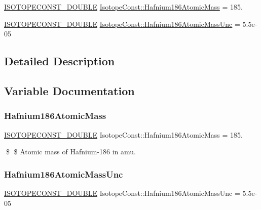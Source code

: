 \begin{DoxyCompactItemize}
\item 
\mbox{\hyperlink{group___isotope_const-_macros_ga8f45a7272ce02c0b4c65c44636ed719a}{I\+S\+O\+T\+O\+P\+E\+C\+O\+N\+S\+T\+\_\+\+D\+O\+U\+B\+LE}} \mbox{\hyperlink{group___isotope_const-_hafnium-_hf186_ga6053bda6cee58afd4e6ec79a62ff7f13}{Isotope\+Const\+::\+Hafnium186\+Atomic\+Mass}} = 185.
\item 
\mbox{\hyperlink{group___isotope_const-_macros_ga8f45a7272ce02c0b4c65c44636ed719a}{I\+S\+O\+T\+O\+P\+E\+C\+O\+N\+S\+T\+\_\+\+D\+O\+U\+B\+LE}} \mbox{\hyperlink{group___isotope_const-_hafnium-_hf186_ga94cd62d9358189abc0dde5c20ef12125}{Isotope\+Const\+::\+Hafnium186\+Atomic\+Mass\+Unc}} = 5.\+5e-\/05
\end{DoxyCompactItemize}


\subsection{Detailed Description}


\subsection{Variable Documentation}
\mbox{\label{group___isotope_const-_hafnium-_hf186_ga6053bda6cee58afd4e6ec79a62ff7f13}} 
\subsubsection{\texorpdfstring{Hafnium186\+Atomic\+Mass}{Hafnium186AtomicMass}}
{\footnotesize\ttfamily \mbox{\hyperlink{group___isotope_const-_macros_ga8f45a7272ce02c0b4c65c44636ed719a}{I\+S\+O\+T\+O\+P\+E\+C\+O\+N\+S\+T\+\_\+\+D\+O\+U\+B\+LE}} Isotope\+Const\+::\+Hafnium186\+Atomic\+Mass = 185.}

\$ \$ Atomic mass of Hafnium-\/186 in amu. \mbox{\label{group___isotope_const-_hafnium-_hf186_ga94cd62d9358189abc0dde5c20ef12125}} 
\subsubsection{\texorpdfstring{Hafnium186\+Atomic\+Mass\+Unc}{Hafnium186AtomicMassUnc}}
{\footnotesize\ttfamily \mbox{\hyperlink{group___isotope_const-_macros_ga8f45a7272ce02c0b4c65c44636ed719a}{I\+S\+O\+T\+O\+P\+E\+C\+O\+N\+S\+T\+\_\+\+D\+O\+U\+B\+LE}} Isotope\+Const\+::\+Hafnium186\+Atomic\+Mass\+Unc = 5.\+5e-\/05}

